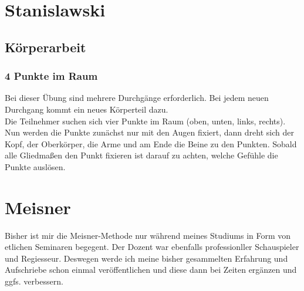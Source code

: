 \documentclass[ngerman, a4paper, twoside]{scrbook}%
\begin{document}
	\newpage

	\chapter{Stanislawski}
	\section{Körperarbeit}
	\subsection{4 Punkte im Raum}
	Bei dieser Übung sind mehrere Durchgänge erforderlich. Bei jedem neuen Durchgang kommt ein neues Körperteil dazu. \\
	Die Teilnehmer suchen sich vier Punkte im Raum (oben, unten, links, rechts). Nun werden die Punkte zunächst nur mit den Augen fixiert, dann dreht sich der Kopf, der Oberkörper, die Arme und am Ende die Beine zu den Punkten. Sobald alle Gliedmaßen den Punkt fixieren ist darauf zu achten, welche Gefühle die Punkte auslösen.

	\chapter{Meisner} %
	Bisher ist mir die Meisner-Methode nur während meines Studiums in Form von etlichen Seminaren begegent. Der Dozent war ebenfalls professionller Schauspieler und Regiesseur. Deswegen werde ich meine bisher gesammelten Erfahrung und Aufschriebe schon einmal veröffentlichen und diese dann bei Zeiten ergänzen und ggfs. verbessern.\\
	\vspace{1cm}
\end{document}
